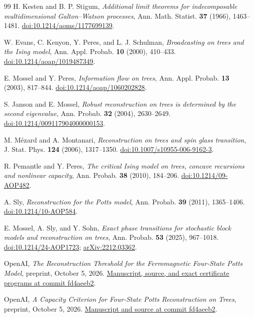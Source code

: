 \begin{thebibliography}{99}
H. Kesten and B. P. Stigum,
\emph{Additional limit theorems for indecomposable multidimensional
Galton--Watson processes}, Ann. Math. Statist. \textbf{37} (1966),
1463--1481. \href{https://doi.org/10.1214/aoms/1177699139}{doi:10.1214/aoms/1177699139}.

W. Evans, C. Kenyon, Y. Peres, and L. J. Schulman,
\emph{Broadcasting on trees and the Ising model},
Ann. Appl. Probab. \textbf{10} (2000), 410--433.
\href{https://doi.org/10.1214/aoap/1019487349}{doi:10.1214/aoap/1019487349}.

E. Mossel and Y. Peres,
\emph{Information flow on trees},
Ann. Appl. Probab. \textbf{13} (2003), 817--844.
\href{https://doi.org/10.1214/aoap/1060202828}{doi:10.1214/aoap/1060202828}.

S. Janson and E. Mossel,
\emph{Robust reconstruction on trees is determined by the second
eigenvalue}, Ann. Probab. \textbf{32} (2004), 2630--2649.
\href{https://doi.org/10.1214/009117904000000153}{doi:10.1214/009117904000000153}.

M. M\'ezard and A. Montanari,
\emph{Reconstruction on trees and spin glass transition},
J. Stat. Phys. \textbf{124} (2006), 1317--1350.
\href{https://doi.org/10.1007/s10955-006-9162-3}{doi:10.1007/s10955-006-9162-3}.

R. Pemantle and Y. Peres,
\emph{The critical Ising model on trees, concave recursions and
nonlinear capacity}, Ann. Probab. \textbf{38} (2010), 184--206.
\href{https://doi.org/10.1214/09-AOP482}{doi:10.1214/09-AOP482}.

A. Sly,
\emph{Reconstruction for the Potts model},
Ann. Probab. \textbf{39} (2011), 1365--1406.
\href{https://doi.org/10.1214/10-AOP584}{doi:10.1214/10-AOP584}.

E. Mossel, A. Sly, and Y. Sohn,
\emph{Exact phase transitions for stochastic block models and
reconstruction on trees}, Ann. Probab. \textbf{53} (2025), 967--1018.
\href{https://doi.org/10.1214/24-AOP1723}{doi:10.1214/24-AOP1723};
\href{https://arxiv.org/abs/2212.03362}{arXiv:2212.03362}.

OpenAI,
\emph{The Reconstruction Threshold for the Ferromagnetic Four-State
Potts Model}, preprint, October 5, 2026.
\href{https://github.com/openai/math/tree/fd4aeeb2ee4fc729c18d98444fed42fd0529eeeb/preprints/The-Reconstruction-Threshold-for-the-Ferromagnetic-Four-State-Potts-Model-October-5-2026}{Manuscript, source, and exact certificate programs at commit fd4aeeb2}.

OpenAI,
\emph{A Capacity Criterion for Four-State Potts Reconstruction on
Trees}, preprint, October 5, 2026.
\href{https://github.com/openai/math/tree/fd4aeeb2ee4fc729c18d98444fed42fd0529eeeb/preprints/A-Capacity-Criterion-for-Four-State-Potts-Reconstruction-on-Trees-October-5-2026}{Manuscript and source at commit fd4aeeb2}.
\end{thebibliography}
